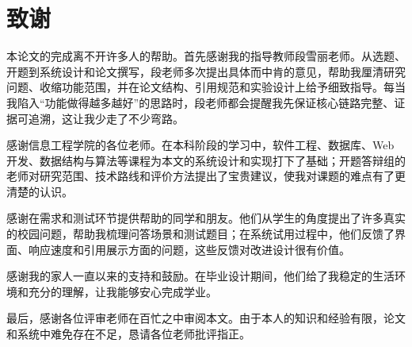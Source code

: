\clearpage
\chapter*{致\quad 谢}
{}

本论文的完成离不开许多人的帮助。首先感谢我的指导教师段雪丽老师。从选题、开题到系统设计和论文撰写，段老师多次提出具体而中肯的意见，帮助我厘清研究问题、收缩功能范围，并在论文结构、引用规范和实验设计上给予细致指导。每当我陷入“功能做得越多越好”的思路时，段老师都会提醒我先保证核心链路完整、证据可追溯，这让我少走了不少弯路。

感谢信息工程学院的各位老师。在本科阶段的学习中，软件工程、数据库、Web 开发、数据结构与算法等课程为本文的系统设计和实现打下了基础；开题答辩组的老师对研究范围、技术路线和评价方法提出了宝贵建议，使我对课题的难点有了更清楚的认识。

感谢在需求和测试环节提供帮助的同学和朋友。他们从学生的角度提出了许多真实的校园问题，帮助我梳理问答场景和测试题目；在系统试用过程中，他们反馈了界面、响应速度和引用展示方面的问题，这些反馈对改进设计很有价值。

感谢我的家人一直以来的支持和鼓励。在毕业设计期间，他们给了我稳定的生活环境和充分的理解，让我能够安心完成学业。

最后，感谢各位评审老师在百忙之中审阅本文。由于本人的知识和经验有限，论文和系统中难免存在不足，恳请各位老师批评指正。
